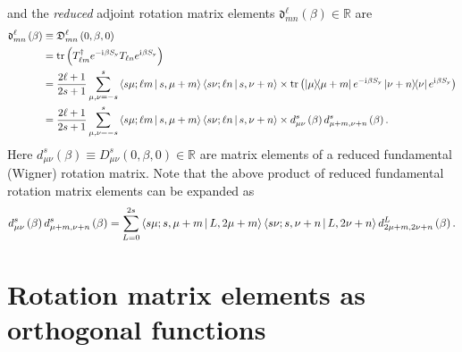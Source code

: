 \documentclass[notitlepage,twocolumn]{revtex4-2}
\newcommand{\f}[2]{\dfrac{#1}{#2}} %
\newcommand{\p}[1]{\left(#1\right)} %
\newcommand{\bk}{\Braket} %
\renewcommand{\i}{\mathrm{i}\mkern1mu} %
\newcommand{\1}{\mathds{1}}
\newcommand{\y}{\text{y}}
\newcommand{\D}{\mathfrak{D}}
\renewcommand{\dd}{\mathfrak{d}}
\newcommand{\RR}{\mathbb{R}}
\begin{document}
and the {\it reduced} adjoint rotation matrix elements $\dd_{mn}^\ell\p{\beta}\in\RR$ are
\begin{align}
  \dd_{mn}^\ell\p{\beta}
  &\equiv \D_{mn}^\ell\p{0,\beta,0} \\
  &= \tr\p{T_{\ell m}^\dag e^{-\i\beta S_\y} T_{\ell n} e^{\i\beta S_\y}} \\
  &= \f{2\ell+1}{2s+1} \sum_{\mu,\nu=-s}^s
  \bk{s\mu;\ell m|s,\mu+m} \bk{s\nu;\ell n|s,\nu+n} \times
  \tr\p{\op{\mu}{\mu+m} e^{-\i\beta S_\y}
    \op{\nu+n}{\nu} e^{\i\beta S_\y}} \\
  &= \f{2\ell+1}{2s+1} \sum_{\mu,\nu=-s}^s
  \bk{s\mu;\ell m|s,\mu+m} \bk{s\nu;\ell n|s,\nu+n} \times
  d_{\mu\nu}^s\p{\beta} d_{\mu+m,\nu+n}^s\p{\beta}.
\end{align}
Here $d_{\mu\nu}^s\p{\beta}\equiv D^s_{\mu\nu}\p{0,\beta,0}\in\RR$ are
matrix elements of a reduced fundamental (Wigner) rotation matrix.
Note that the above product of reduced fundamental rotation matrix elements can be expanded as \cite{rose1957elementary}
\begin{align}
  d_{\mu\nu}^s\p{\beta} d_{\mu+m,\nu+n}^s\p{\beta}
  = \sum_{L=0}^{2s} \bk{s\mu;s,\mu+m|L,2\mu+m}
  \bk{s\nu;s,\nu+n|L,2\nu+n} d_{2\mu+m,2\nu+n}^L\p{\beta}.
\end{align}

\section{Rotation matrix elements as orthogonal functions}
\label{sec:ortho}
\end{document}
